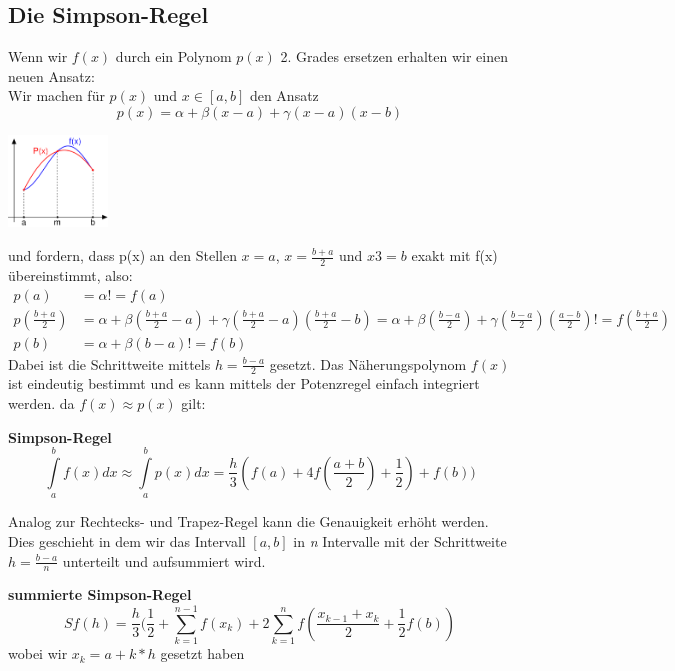\documentclass{article}
\newenvironment{Figure}
	{\par\medskip\noindent\minipage{\linewidth}}
	{\endminipage\par\medskip}
\theoremstyle{satz}
\theoremstyle{definition}
\begin{document}
\subsection{Die Simpson-Regel}
Wenn wir $f(x)$ durch ein Polynom $p(x)$ 2. Grades ersetzen erhalten wir einen neuen Ansatz:\\
Wir machen für $p(x)$ und $x \in [a,b]$ den Ansatz
\begin{equation}
p(x) = \alpha + \beta(x-a) + \gamma(x-a)(x-b)
\end{equation}
\begin{Figure}
\centering
\includegraphics[width=100px]{img/SimpsonRegel.png}
	\label{fig:Funktion f(x) wird auf dem Intervall durch ein Polynom P(x) angenähert}
\end{Figure}
und fordern, dass p(x) an den Stellen $x=a$, $x=\frac{b+a}{2}$ und $x3=b$ exakt mit f(x) übereinstimmt, also:
\begin{equation}
\begin{split}
p(a) &= \alpha != f(a)\\
p(\frac{b+a}{2}) &= \alpha + \beta(\frac{b+a}{2}-a) + \gamma(\frac{b+a}{2}-a)(\frac{b+a}{2}-b) = \alpha + \beta(\frac{b-a}{2}) + \gamma(\frac{b-a}{2})(\frac{a-b}{2}) != f(\frac{b+a}{2})\\
p(b) &= \alpha + \beta(b-a) != f(b)
\end{split}
\end{equation}
Dabei ist die Schrittweite mittels $h = \frac{b-a}{2}$ gesetzt. Das Näherungspolynom $f(x)$ ist eindeutig bestimmt und es kann mittels der Potenzregel einfach integriert werden. da $f(x) \approx p(x)$ gilt: \\
\begin{tcolorbox}
\textbf{Simpson-Regel}
\begin{equation}
\int\limits_{a}^{b}f(x)dx\approx \int\limits_{a}^{b}p(x)dx = \frac{h}{3}(f(a)+4f(\frac{a+b}{2})+\frac{1}{2})+f(b))
\end{equation}
\end{tcolorbox}
Analog zur Rechtecks- und Trapez-Regel kann die Genauigkeit erhöht werden. Dies geschieht in dem wir das Intervall $[a,b]$ in \textit{n} Intervalle mit der Schrittweite $h=\frac{b-a}{n}$ unterteilt und aufsummiert wird.
\begin{tcolorbox}
\textbf{summierte Simpson-Regel}
\begin{equation}
Sf(h) = \frac{h}{3}(\frac{1}{2}+\sum\limits_{k=1}^{n-1}f(x_k)+2\sum\limits_{k=1}^{n}f(\frac{x_{k-1}+x_k}{2}+\frac{1}{2}f(b))
\end{equation}
wobei wir $x_k = a+k*h$ gesetzt haben
\end{tcolorbox}
\end{document}
